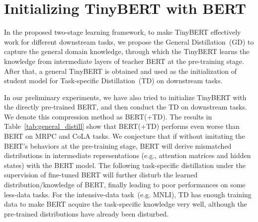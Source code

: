 \documentclass[11pt,a4paper]{article}
\begin{document}
\section{Initializing TinyBERT with BERT}
\label{apx:bert_small}


In the proposed two-stage learning framework, to make TinyBERT effectively work for different downstream tasks, we propose the General Distillation~(GD) to capture the general domain knowledge, through which the TinyBERT learns the knowledge from intermediate layers of teacher BERT at the pre-training stage. After that, a general TinyBERT is obtained and used as the initialization of student model for Task-specific Distillation~(TD) on downstream tasks. 



\begin{table}[t]
	\begin{center}
		\caption{Results of different methods at pre-training stage. TD and GD refers to Task-specific Distillation (without data augmentation) and General Distillation, respectively. The results are evaluated on dev set.}
		\label{tab:general_distill}
	\end{center}
\end{table}

In our preliminary experiments, we have also tried to initialize TinyBERT with the directly pre-trained BERT, and then conduct the TD on downstream tasks. We denote this compression method as BERT(+TD). The results in Table~\ref{tab:general_distill} show that BERT(+TD) performs even worse than  BERT on MRPC and CoLA tasks. We conjecture that if without imitating the BERT's behaviors at the pre-training stage, BERT will derive mismatched distributions in intermediate representations (e.g., attention matrices and hidden states) with the BERT model. The following task-specific distillation under the supervision of fine-tuned BERT will further disturb the learned distribution/knowledge of BERT, finally leading to poor performances on some less-data tasks. For the intensive-data task~(e.g. MNLI), TD has enough training data to make BERT acquire the task-specific knowledge very well, although the pre-trained distributions have already been disturbed.
\end{document}
